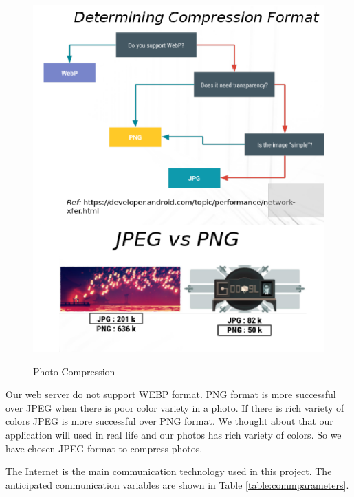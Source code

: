 \begin{figure}[!htbp]
\centering
\includegraphics[height=38em]{projectChapters/images/photoCompression.png}
\caption{Photo Compression}
\label{fig:photoCompression}
\end{figure}

Our web server do not support WEBP format. PNG format is more successful over JPEG when there is poor color variety in a photo. If there is rich variety of colors JPEG is more successful over PNG format. We thought about that our application will used in real life and our photos has rich variety of colors. So we have chosen JPEG format to compress photos.

The Internet is the main communication technology used in this project. The
anticipated communication variables are shown in Table \ref{table:commparameters}.

